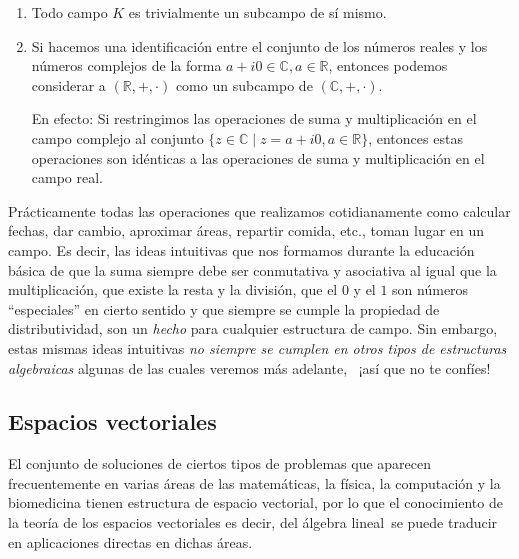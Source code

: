 \documentclass[notasLineal]{subfiles}
\begin{document}
\begin{Obs}\label{Obs: Subcampo}
    \begin{enumerate}[label=(\arabic*)]\leavevmode
    
        \item Todo campo $K$ es trivialmente un subcampo de sí mismo.

        \item Si hacemos una identificación entre el conjunto de los números reales y los números complejos de la forma $a+i0\in\mathbb{C}, a\in\mathbb{R}$, entonces podemos considerar a $(\mathbb{R},+,\cdot)$ como un subcampo de $(\mathbb{C},+,\cdot)$.

            En efecto: Si restringimos las operaciones de suma y multiplicación en el campo complejo al conjunto $\{z\in\mathbb{C}\mid z = a+i0, a\in\mathbb{R}\}$, entonces estas operaciones son idénticas a las operaciones de suma y multiplicación en el campo real.
    \end{enumerate}
\end{Obs}

Prácticamente todas las operaciones que realizamos cotidianamente como calcular fechas, dar cambio, aproximar áreas, repartir comida, etc., toman lugar en un campo. Es decir, las ideas intuitivas que nos formamos durante la educación básica de que la suma siempre debe ser conmutativa y asociativa \textemdash al igual que la multiplicación\textemdash, que existe la resta y la división, que el $0$ y el $1$ son números ``especiales'' en cierto sentido y que siempre se cumple la propiedad de distributividad, son un \emph{hecho} para cualquier estructura de campo. Sin embargo, estas mismas ideas intuitivas \emph{no siempre se cumplen en otros tipos de estructuras algebraicas} \textemdash algunas de las cuales veremos más adelante\textemdash, \ ¡así que no te confíes!

\subsection*{Espacios vectoriales} \label{Ssec: Espacios vectoriales}

El conjunto de soluciones de ciertos tipos de problemas que aparecen frecuentemente en varias áreas de las matemáticas, la física, la computación y la biomedicina tienen estructura de espacio vectorial, por lo que el conocimiento de la teoría de los espacios vectoriales \textemdash es decir, del álgebra lineal\textemdash \ se puede traducir en aplicaciones directas en dichas áreas. 
\end{document}
